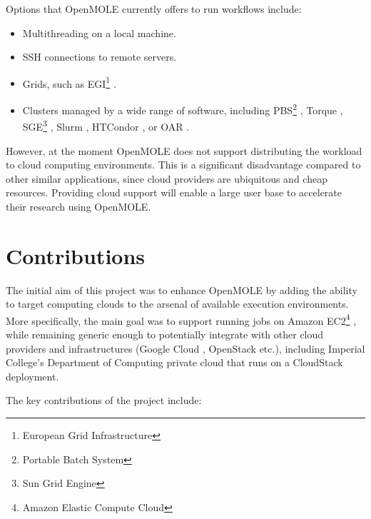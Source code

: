 Options that OpenMOLE currently offers to run workflows include:

\begin{itemize}
	\item Multithreading on a local machine.
	\item SSH connections to remote servers.
	\item Grids, such as EGI\footnote{European Grid Infrastructure} \cite{EGI}.
	\item Clusters managed by a wide range of software, including PBS\footnote{Portable Batch System} \cite{PBS}, Torque \cite{Torque}, SGE\footnote{Sun Grid Engine} \cite{SGE}, Slurm \cite{SLURM}, HTCondor \cite{HTCondor}, or OAR \cite{OAR}.
\end{itemize}

However, at the moment OpenMOLE does not support distributing the workload to cloud computing environments. This is a significant disadvantage compared to other similar applications, since cloud providers are ubiquitous and cheap resources. Providing cloud support will enable a large user base to accelerate their research using OpenMOLE.

\section{Contributions}

The initial aim of this project was to enhance OpenMOLE by adding the ability to target computing clouds to the arsenal of available execution environments. More specifically, the main goal was to support running jobs on Amazon EC2\footnote{Amazon Elastic Compute Cloud} \cite{EC2}, while remaining generic enough to potentially integrate with other cloud providers and infrastructures (Google Cloud \cite{GoogleCloud}, OpenStack \cite{OpenStack} etc.), including Imperial College's Department of Computing private cloud that runs on a CloudStack \cite{CloudStack} deployment.

The key contributions of the project include:


